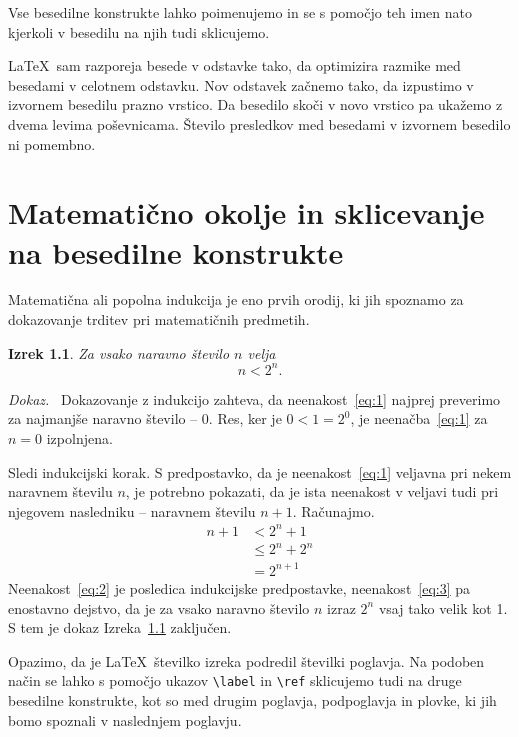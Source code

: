 \documentclass[a4paper,12pt,openright]{book}
\newtheorem{izrek}{Izrek}[chapter]
\newenvironment{dokaz}{\emph{Dokaz.}\ }{\hspace{\fill}{$\Box$}}
\begin{document}
Vse besedilne konstrukte lahko poimenujemo in se s pomočjo teh imen nato  kjerkoli v besedilu na njih  tudi sklicujemo.

\LaTeX\ sam razporeja besede v odstavke tako, da optimizira razmike med besedami v celotnem odstavku.
Nov odstavek začnemo tako, da izpustimo v izvornem besedilu prazno vrstico. Da besedilo skoči v novo vrstico pa ukažemo z dvema levima poševnicama.
Število presledkov med besedami v izvornem besedilo ni pomembno.


\chapter{Matematično okolje in sklicevanje na besedilne konstrukte}
\label{ch1}

Matematična ali popolna indukcija je eno prvih orodij, ki jih spoznamo za dokazovanje trditev pri matematičnih predmetih.
\begin{izrek}
	\label{iz:1}
	Za vsako naravno število $n$ velja
	\begin{equation}
		n < 2^n.
		\label{eq:1}
	\end{equation}
\end{izrek}
\begin{dokaz}
	Dokazovanje z indukcijo zahteva, da neenakost~\eqref{eq:1} najprej preverimo za najmanjše naravno število -- $0$.
	Res, ker je $0 < 1 = 2^0$, je neenačba~\eqref{eq:1} za $n=0$ izpolnjena.

	Sledi indukcijski korak. S predpostavko, da je neenakost~\eqref{eq:1} veljavna pri nekem naravnem številu $n$, je potrebno pokazati, da je ista neenakost v veljavi tudi pri njegovem nasledniku -- naravnem številu $n+1$.
	Računajmo.
	\begin{align}
		n+1 & < 2^n + 1       \label{eq:2} \\
		    & \le 2^n + 2^n \label{eq:3}   \\
		    & = 2^{n+1}       \nonumber
	\end{align}
	Neenakost~\eqref{eq:2} je posledica indukcijske predpostavke, neenakost~\eqref{eq:3} pa enostavno dejstvo, da je za vsako naravno število $n$ izraz $2^n$ vsaj tako velik kot 1.
	S tem je dokaz Izreka~\ref{iz:1} zaključen.
\end{dokaz}

Opazimo, da je \LaTeX\ številko izreka podredil številki poglavja.
Na podoben način se lahko s pomočjo ukazov \verb|\label| in \verb|\ref| sklicujemo tudi na druge besedilne konstrukte, kot so med drugim poglavja, podpoglavja in plovke, ki jih bomo spoznali v naslednjem poglavju.
\end{document}

